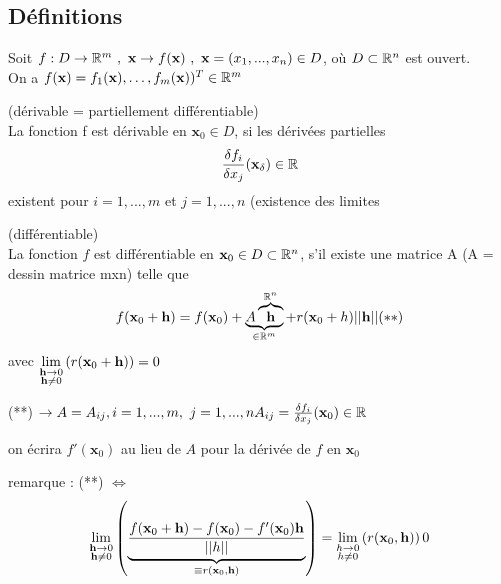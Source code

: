 \documentclass[12pt,a4paper]{article}
\begin{document}
\subsection{Définitions}
Soit $f:D \to \mathbb{R}^m\ , \ \textbf{x}\to f(\textbf{x})\ , \ \textbf{x}=(x_1,...,x_n) \in D$, où $D \subset \mathbb{R}^n$ est ouvert.\\
On a $f(\textbf{x}) = f_1(\textbf{x}),\ldots,f_m(\textbf{x}))^T \in \mathbb{R}^m$
\begin{boite}
	 (dérivable = partiellement différentiable)\\
	La fonction f est dérivable en $\textbf{x}_0 \in D$, si les dérivées partielles 
	\begin{equation*}
		\frac{\delta f_i}{\delta x_j}(\textbf{x}_\delta) \in \mathbb{R}
	\end{equation*}
	existent pour $i = 1,...,m$ et $j=1,...,n$ (existence des limites
\end{boite}
\begin{boite}
	  (différentiable)\\
	La fonction $f$ est différentiable en $\textbf{x}_0 \in  D \subset \mathbb{R}^n$, s'il existe une matrice A (A = {dessin matrice mxn})
	telle que 
	\begin{equation*}
		f(\textbf{x}_0 + \textbf{h}) = f(\textbf{x}_0) + \underbrace{A\overbrace{\textbf{h}}^{\mathbb{R}^n}}_{\in \mathbb{R}^m} + r(\textbf{x}_0 + h)||\textbf{h}|| (**)
	\end{equation*}
	avec $\lim\limits_{\substack{\textbf{h}\to 0 \\ \textbf{h}\neq 0}}\left(r(\textbf{x}_0 + \textbf{h})\right) = 0$
\end{boite}
\begin{boite}
	 (**) $\to A = A_{ij}, i = 1,...,m,\ j=1,...,n\\
	A_{ij} = \frac{\delta f_i}{\delta x_j}(\textbf{x}_0) \in \R$
\end{boite}
\begin{boite}
	 on écrira $f'(\textbf{x}_0)$ au lieu de $A$ pour la dérivée de $f$ en $\textbf{x}_0$
\end{boite}
\begin{boite}
	remarque : (**) $\iff$
	\begin{equation*}
		\lim\limits_{\substack{\textbf{h}\to 0 \\ \textbf{h} \neq 0}}\left(\underbrace{\frac{f(\textbf{x}_0 + \textbf{h}) - f(\textbf{x}_0) - f'(\textbf{x}_0)\textbf{h}}{||h||}}_{\equiv r(\textbf{x}_0,\textbf{h})}\right) = \lim\limits_{\substack{h\to 0 \\ h\neq 0}}\left(r(\textbf{x}_0,\textbf{h})\right) 0
	\end{equation*}
\end{boite}
\end{document}
